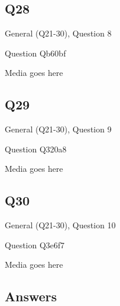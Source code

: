 \documentclass[11pt]{beamer}
\begin{document}
\subsection*{Q28}
\begin{frame}[t]{General (Q21-30), Question 8}
\vspace{2em}
\begin{block}{Question}
Qb60bf
\end{block}
\begin{center}
Media goes here
\end{center}
\end{frame}
    

\subsection*{Q29}
\begin{frame}[t]{General (Q21-30), Question 9}
\vspace{2em}
\begin{block}{Question}
Q320a8
\end{block}
\begin{center}
Media goes here
\end{center}
\end{frame}
    

\subsection*{Q30}
\begin{frame}[t]{General (Q21-30), Question 10}
\vspace{2em}
\begin{block}{Question}
Q3e6f7
\end{block}
\begin{center}
Media goes here
\end{center}
\end{frame}
    
\subsection{Answers}
\end{document}
